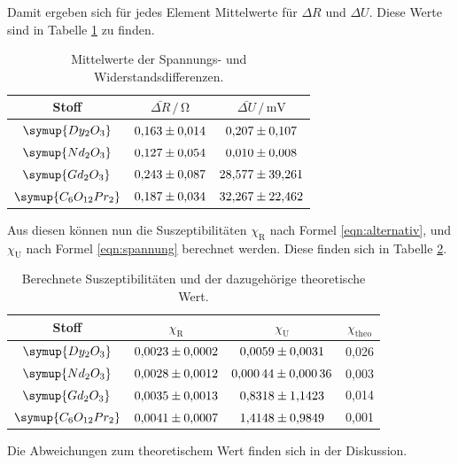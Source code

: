Damit ergeben sich für jedes Element Mittelwerte für $\Delta R$ und $\Delta U$. 
Diese Werte sind in Tabelle \ref{tab:Mittelwerte} zu finden.

\begin{table}
\centering
\caption{Mittelwerte der Spannungs- und Widerstandsdifferenzen.}
\label{tab:Mittelwerte}
\begin{tabular}{c c c}
\toprule
Stoff & $\bar{\Delta R} \,/\, \si{\ohm}$ & $\bar{\Delta U} \,/\, \si{\milli\volt}$\\
\midrule
$\symup{Dy_2O_3}$ & $\num{0.163+-0.014}$ & $\num{0.207+-0.107}$\\
$\symup{Nd_2O_3}$ & $\num{0.127+-0.054}$ & $\num{0.010+-0.008}$\\
$\symup{Gd_2O_3}$ & $\num{0.243+-0.087}$ & $\num{28.577+-39.261}$\\
$\symup{C_6O_\text{12}Pr_2}$ & $\num{0.187+-0.034}$ & $\num{32.267+-22.462}$\\
\bottomrule
\end{tabular}
\end{table}


Aus diesen können nun die Suszeptibilitäten $\chi_\text{R}$ nach Formel \eqref{eqn:alternativ},
und $\chi_\text{U}$ nach Formel \eqref{eqn:spannung} berechnet werden.
Diese finden sich in Tabelle \ref{tab:Mittelwerte2}.  

\begin{table}
\centering
\caption{Berechnete Suszeptibilitäten und der dazugehörige theoretische Wert.}
\label{tab:Mittelwerte2}
\begin{tabular}{c c c c}
\toprule
Stoff & $\chi_\text{R}$ & $\chi_\text{U}$ & $\chi_\text{theo}$\\
\midrule
$\symup{Dy_2O_3}$ & $\num{0.0023+-0.0002}$ & $\num{0.0059+-0.0031}$ & 0,026\\
$\symup{Nd_2O_3}$ & $\num{0.0028+-0.0012}$ & $\num{0.00044+-0.00036}$ & 0,003 \\
$\symup{Gd_2O_3}$ & $\num{0.0035+-0.0013}$ & $\num{0.8318+-1.1423}$ & 0,014\\
$\symup{C_6O_\text{12}Pr_2}$ & $\num{0.0041+-0.0007}$ & $\num{1.4148+-0.9849}$ & 0,001 \\
\bottomrule
\end{tabular}
\end{table}

Die Abweichungen zum theoretischem Wert finden sich in der Diskussion.  


